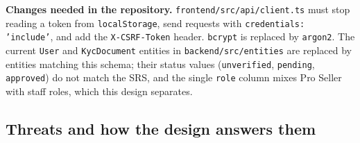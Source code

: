 \documentclass[11pt,a4paper]{article}
\begin{document}
\textbf{Changes needed in the repository.} \texttt{frontend/src/api/client.ts} must stop reading a token from \texttt{localStorage}, send requests with \texttt{credentials: 'include'}, and add the \texttt{X-CSRF-Token} header. \texttt{bcrypt} is replaced by \texttt{argon2}. The current \texttt{User} and \texttt{KycDocument} entities in \texttt{backend/src/entities} are replaced by entities matching this schema; their status values (\texttt{unverified}, \texttt{pending}, \texttt{approved}) do not match the SRS, and the single \texttt{role} column mixes Pro Seller with staff roles, which this design separates.

\subsection{Threats and how the design answers them}
\end{document}
